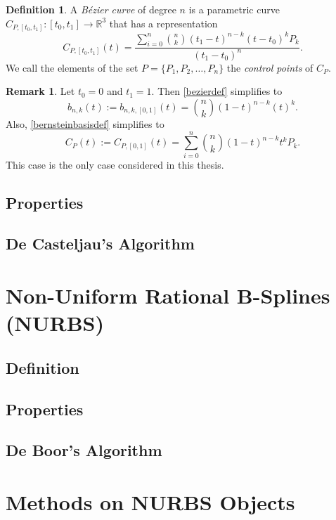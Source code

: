 \documentclass[a4paper, 11pt]{report}
\renewcommand{\emph}[1]{\textit{#1}}
\theoremstyle{definition}
\newtheorem{definition}{Definition}[section]
\newtheorem*{remark}{Remark}
\begin{document}
\begin{definition}
	A \emph{Bézier curve} of degree $n$ is a parametric curve $C_{P,[t_0, t_1]}: [t_0, t_1] \rightarrow \mathbb{R}^3$ that has a representation
	\begin{equation}\label{bezierdef}
		C_{P, [t_0, t_1]}(t) = \frac{\sum_{i=0}^n \binom{n}{k} (t_1-t)^{n-k}(t-t_0)^k P_k}{(t_1-t_0)^n}.
	\end{equation}
	We call the elements of the set $P = \{P_1, P_2, \dots, P_n\}$ the \emph{control points} of $C_P$.
\end{definition}

\begin{remark}
	Let $t_0 = 0$ and $t_1 = 1$. Then \ref{bezierdef} simplifies to
	\begin{equation}
		b_{n,k}(t) := b_{n,k,[0,1]}(t) = \binom{n}{k} (1-t)^{n-k}(t)^k.
	\end{equation}
	Also, \ref{bernsteinbasisdef} simplifies to
	\begin{equation}
		C_P(t) := C_{P,[0,1]}(t)= \sum_{i=0}^n \binom{n}{k} (1-t)^{n-k}t^k P_k.
	\end{equation}
	This case is the only case considered in this thesis.
\end{remark}




\subsection{Properties}
\subsection{De Casteljau's Algorithm}

\section{Non-Uniform Rational B-Splines (NURBS)}
\subsection{Definition}
\subsection{Properties}
\subsection{De Boor's Algorithm}

\section{Methods on NURBS Objects}
\end{document}
